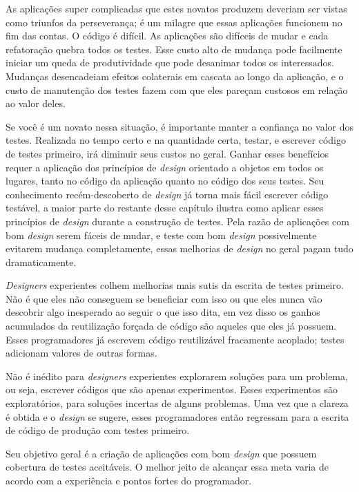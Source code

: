 As aplicações super complicadas que estes novatos produzem deveriam ser vistas como triunfos da perseverança; é um milagre que essas aplicações funcionem no fim das contas. O código é difícil. As aplicações são difíceis de mudar e cada refatoração quebra todos os testes. Esse custo alto de mudança pode facilmente iniciar um queda de produtividade que pode desanimar todos os interessados. Mudanças desencadeiam efeitos colaterais em cascata ao longo da aplicação, e o custo de manutenção dos testes fazem com que eles pareçam custosos em relação ao valor deles.

Se você é um novato nessa situação, é importante manter a confiança no valor dos testes. Realizada no tempo certo e na quantidade certa, testar, e escrever código de testes primeiro, irá diminuir seus custos no geral. Ganhar esses benefícios requer a aplicação dos princípios de \textit{design} orientado a objetos em todos os lugares, tanto no código da aplicação quanto no código dos seus testes. Seu conhecimento recém-descoberto de \textit{design} já torna mais fácil escrever código testável, a maior parte do restante desse capítulo ilustra como aplicar esses princípios de \textit{design} durante a construção de testes. Pela razão de aplicações com bom \textit{design} serem fáceis de mudar, e teste com bom \textit{design} possivelmente evitarem mudança completamente, essas melhorias de \textit{design} no geral pagam tudo dramaticamente.

\textit{Designers} experientes colhem melhorias mais sutis da escrita de testes primeiro. Não é que eles não conseguem se beneficiar com isso ou que eles nunca vão descobrir algo inesperado ao seguir o que isso dita, em vez disso os ganhos acumulados da reutilização forçada de código são aqueles que eles já possuem. Esses programadores já escrevem código reutilizável fracamente acoplado; testes adicionam valores de outras formas.

Não é inédito para \textit{designers} experientes explorarem soluções para um problema, ou seja, escrever códigos que são apenas experimentos. Esses experimentos são exploratórios, para soluções incertas de alguns problemas. Uma vez que a clareza é obtida e o \textit{design} se sugere, esses programadores então regressam para a escrita de código de produção com testes primeiro.

Seu objetivo geral é a criação de aplicações com bom \textit{design} que possuem cobertura de testes aceitáveis. O melhor jeito de alcançar essa meta varia de acordo com a experiência e pontos fortes do programador.

